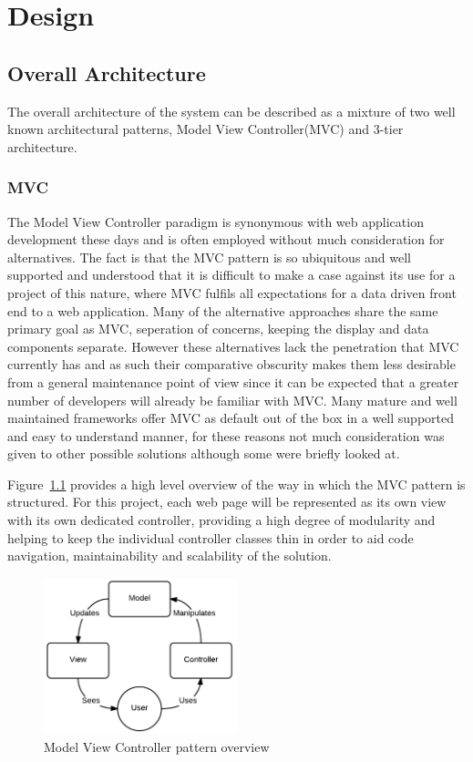 \chapter{Design}

\section{Overall Architecture}\label{arch}

The overall architecture of the system can be described as a mixture of two well known architectural patterns, Model View Controller(MVC) and 3-tier architecture. 

\subsection{MVC}\label{sec_mvc}

The Model View Controller paradigm is synonymous with web application development these days and is often employed without much consideration for alternatives. The fact is that the MVC pattern is so ubiquitous and well supported and understood that it is difficult to make a case against its use for a project of this nature, where MVC fulfils all expectations for a data driven front end to a web application. Many of the alternative approaches share the same primary goal as MVC, seperation of concerns, keeping the display and data components separate. However these alternatives lack the penetration that MVC currently has and as such their comparative obscurity makes them less desirable from a general maintenance point of view since it can be expected that a greater number of developers will already be familiar with MVC. Many mature and well maintained frameworks offer MVC as default out of the box in a well supported and easy to understand manner, for these reasons not much consideration was given to other possible solutions although some were briefly looked at.

Figure~\ref{fig:mvc} provides a high level overview of the way in which the MVC pattern is structured. For this project, each web page will be represented as its own view with its own dedicated controller, providing a high degree of modularity and helping to keep the individual controller classes thin in order to aid code navigation, maintainability and scalability of the solution. 

\begin{figure}[H]
    \centering
    \includegraphics[width=0.5\textwidth]{images/design/mvc}
    \caption{Model View Controller pattern overview}
    \label{fig:mvc}
\end{figure}



